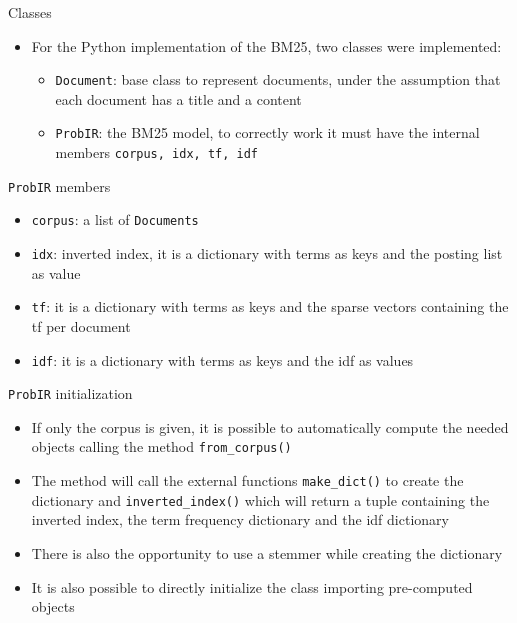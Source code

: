 \documentclass[]{beamer}
\begin{document}
\begin{frame}{Classes}
    \begin{itemize}
        \item For the Python implementation of the BM25, two classes were implemented:
        \begin{itemize}
            \item \texttt{Document}: base class to represent documents, under the assumption that each document has a title and a content
            \item \texttt{ProbIR}: the BM25 model, to correctly work it must have the internal members \texttt{corpus, idx, tf, idf}
        \end{itemize}
    \end{itemize}
\end{frame}
\begin{frame}{\texttt{ProbIR} members}
    \begin{itemize}
        \item \texttt{corpus}: a list of \texttt{Documents}
        \item \texttt{idx}: inverted index, it is a dictionary with terms as keys and the posting list as value
        \item \texttt{tf}: it is a dictionary with terms as keys and the sparse vectors containing the tf per document
        \item \texttt{idf}: it is a dictionary with terms as keys and the idf as values
    \end{itemize}
\end{frame}
\begin{frame}{\texttt{ProbIR} initialization}
    \begin{itemize}
        \item If only the corpus is given, it is possible to automatically compute the needed objects calling the method \texttt{from\_corpus()}
        \item The method will call the external functions \texttt{make\_dict()} to create the dictionary and \texttt{inverted\_index()} which will return a tuple 
            containing the inverted index, the term frequency dictionary and the idf dictionary
        \item There is also the opportunity to use a stemmer while creating the dictionary
        \item It is also possible to directly initialize the class importing pre-computed objects
    \end{itemize}
\end{frame}
\end{document}
